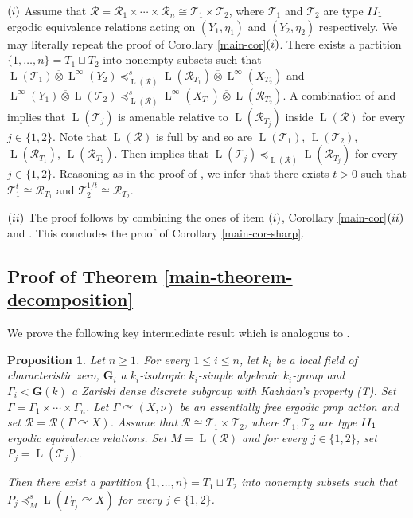 \documentclass[11pt]{amsart}
\numberwithin{equation}{section}
\theoremstyle{plain}
\newtheorem{prop}[thm]{Proposition}
\theoremstyle{definition}
\newcommand{\ovt}{\mathbin{\overline{\otimes}}}
\newcommand{\rL}{\operatorname{L}}
\begin{document}
$(\rm i)$ Assume that $\mathscr R = \mathscr R_1 \times \cdots \times \mathscr R_n \cong \mathscr T_1 \times \mathscr T_2$, where $\mathscr T_1$ and $\mathscr T_2$ are type ${\rm II_1}$ ergodic equivalence relations acting on $(Y_1, \eta_1)$ and $(Y_2, \eta_2)$ respectively. We may literally repeat the proof of Corollary \ref{main-cor}$(\rm i)$. There exists a partition $\{1, \dots, n\} = T_1 \sqcup T_2$ into nonempty subsets such that $\rL(\mathscr T_1) \ovt \rL^\infty(Y_2) \preceq^s_{\rL(\mathscr R)} \rL(\mathscr R_{T_1}) \ovt \rL^\infty(X_{T_2})$ and $\rL^\infty(Y_1) \ovt \rL(\mathscr T_2) \preceq^s_{\rL(\mathscr R)} \rL^\infty(X_{T_1}) \ovt \rL(\mathscr R_{T_2})$. A combination of \cite[Lemma 2.6(3)]{DHI16} and \cite[Proposition 2.4(3)]{OP07} implies that $\rL(\mathscr T_j)$ is amenable relative to $\rL(\mathscr R_{T_j})$ inside $\rL(\mathscr R)$ for every $j \in \{1, 2\}$. Note that $\rL(\mathscr R)$ is full by \cite[Corollary 2.3]{Co75} and so are $\rL(\mathscr T_1)$, $\rL(\mathscr T_2)$, $\rL(\mathscr R_{T_1})$, $\rL(\mathscr R_{T_2})$. Then \cite[Lemma 5.2]{IM19} implies that $\rL(\mathscr T_j) \preceq_{\rL(\mathscr R)} \rL(\mathscr R_{T_j})$ for every $j \in \{1, 2\}$. Reasoning as in the proof of \cite[Corollary E(1)]{Ho15}, we infer that there exists $t > 0$ such that $\mathscr T_1^t \cong \mathscr R_{T_1}$ and $\mathscr T_2^{1/t} \cong \mathscr R_{T_2}$.

$(\rm ii)$ The proof follows by combining the ones of item $(\rm i)$, Corollary \ref{main-cor}$(\rm ii)$ and \cite[Corollary E]{Ho15}. This concludes the proof of Corollary \ref{main-cor-sharp}.



\subsection{Proof of Theorem \ref{main-theorem-decomposition}}

We prove the following key intermediate result which is analogous to \cite[Proposition 4.1]{Dr19}.

\begin{prop}\label{prop-key}
Let $n \geq 1$. For every $1 \leq i \leq n$, let $k_i$ be a local field of characteristic zero, $\mathbf G_i$ a $k_i$-isotropic $k_i$-simple algebraic $k_i$-group and $\Gamma_i < \mathbf G(k)$ a Zariski dense discrete subgroup with Kazhdan's property {\em (T)}. Set $\Gamma = \Gamma_1 \times \cdots \times \Gamma_n$. Let $\Gamma \curvearrowright (X, \nu)$ be an essentially free ergodic pmp action and set $\mathscr R = \mathscr R(\Gamma \curvearrowright X)$. Assume that $\mathscr R \cong \mathscr T_1 \times \mathscr T_2$, where $\mathscr T_1, \mathscr T_2$ are type ${\rm II_1}$ ergodic equivalence relations. Set $M = \rL(\mathscr R)$ and for every $j \in \{1, 2\}$, set $P_j = \rL(\mathscr T_j)$.

Then there exist a partition $\{1, \dots, n\} = T_1 \sqcup T_2$ into nonempty subsets such that $P_j \preceq^s_M \rL(\Gamma_{T_j} \curvearrowright X)$ for every $j \in \{1, 2\}$.
\end{prop}
\end{document}
